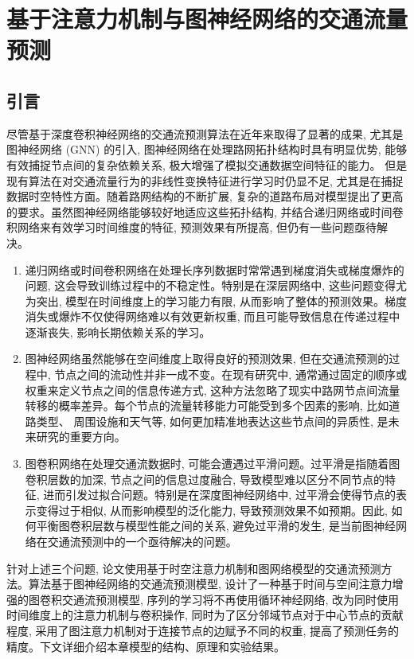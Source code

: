 
\chapter{基于注意力机制与图神经网络的交通流量预测}\label{chap:based_gnn_attention}
\section{引言}
尽管基于深度卷积神经网络的交通流预测算法在近年来取得了显著的成果, 尤其是图神经网络 (GNN) 的引入, 图神经网络在处理路网拓扑结构时具有明显优势, 能够有效捕捉节点间的复杂依赖关系, 极大增强了模拟交通数据空间特征的能力。 但是现有算法在对交通流量行为的非线性变换特征进行学习时仍显不足, 尤其是在捕捉数据时空特性方面。随着路网结构的不断扩展, 复杂的道路布局对模型提出了更高的要求。虽然图神经网络能够较好地适应这些拓扑结构, 并结合递归网络或时间卷积网络来有效学习时间维度的特征, 预测效果有所提高, 但仍有一些问题亟待解决。

\begin{enumerate}[(1)]
  \item 递归网络或时间卷积网络在处理长序列数据时常常遇到梯度消失或梯度爆炸的问题, 这会导致训练过程中的不稳定性。特别是在深层网络中, 这些问题变得尤为突出, 模型在时间维度上的学习能力有限, 从而影响了整体的预测效果。梯度消失或爆炸不仅使得网络难以有效更新权重, 而且可能导致信息在传递过程中逐渐丧失, 影响长期依赖关系的学习。

  \item 图神经网络虽然能够在空间维度上取得良好的预测效果, 但在交通流预测的过程中, 节点之间的流动性并非一成不变。在现有研究中, 通常通过固定的顺序或权重来定义节点之间的信息传递方式, 这种方法忽略了现实中路网节点间流量转移的概率差异。每个节点的流量转移能力可能受到多个因素的影响, 比如道路类型、 周围设施和天气等, 如何更加精准地表达这些节点间的异质性, 是未来研究的重要方向。
  
  \item 图卷积网络在处理交通流数据时, 可能会遭遇过平滑问题。过平滑是指随着图卷积层数的加深, 节点之间的信息过度融合, 导致模型难以区分不同节点的特征, 进而引发过拟合问题。特别是在深度图神经网络中, 过平滑会使得节点的表示变得过于相似, 从而影响模型的泛化能力, 导致预测效果不如预期。因此, 如何平衡图卷积层数与模型性能之间的关系, 避免过平滑的发生, 是当前图神经网络在交通流预测中的一个亟待解决的问题。
\end{enumerate}

针对上述三个问题, 论文使用基于时空注意力机制和图网络模型的交通流预测方法。算法基于图神经网络的交通流预测模型, 设计了一种基于时间与空间注意力增强的图卷积交通流预测模型, 序列的学习将不再使用循环神经网络, 改为同时使用时间维度上的注意力机制与卷积操作, 同时为了区分邻域节点对于中心节点的贡献程度, 采用了图注意力机制对于连接节点的边赋予不同的权重, 提高了预测任务的精度。下文详细介绍本章模型的结构、原理和实验结果。


